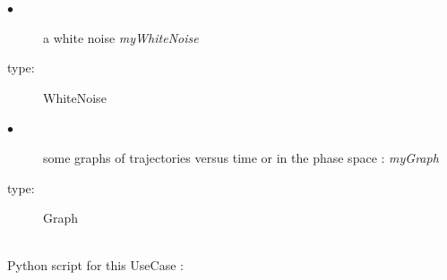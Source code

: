 {
  \begin{description}
  \item[$\bullet$] a white noise {\itshape myWhiteNoise}
  \item[type:]  WhiteNoise
  \end{description}

  \begin{description}
  \item[$\bullet$] some graphs of trajectories versus time or in the phase space : {\itshape myGraph}
  \item[type:]  Graph
  \end{description}
}

\textspace\\
Python script for this UseCase :

